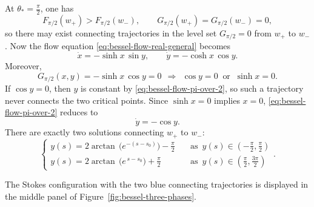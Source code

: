 \documentclass[11pt]{amsart}
\theoremstyle{plain}
\begin{document}
At \(\theta_*=\frac{\pi}{2}\), one has 
\[F_{\pi/2}(w_+)>F_{\pi/2}(w_-),\qquad G_{\pi/2}(w_+)=G_{\pi/2}(w_-)=0,\]
so there may exist connecting trajectories in the level set $G_{\pi/2}=0$ from \(w_+\) to \(w_-\). Now the flow equation \eqref{eq:bessel-flow-real-general} becomes
\begin{equation}\label{eq:bessel-flow-pi-over-2}
\dot x=-\sinh x\,\sin y,
\qquad
\dot y=-\cosh x\,\cos y.
\end{equation}
Moreover, 
\[
G_{\pi/2}(x,y)=-\sinh x\,\cos y=0~~\Longrightarrow~~ \cos y=0~\text{ or }~ \sinh x=0.
\]
If \(\cos y=0\), then \(y\) is constant by \eqref{eq:bessel-flow-pi-over-2}, so such a trajectory never connects the two critical points.  Since $\sinh x=0$ implies $x=0$, \eqref{eq:bessel-flow-pi-over-2} reduces to
\[
\dot y=-\cos y.
\]
There are exactly two solutions connecting \(w_+\) to \(w_-\):
\begin{equation*}\label{eq:bessel-traj-right}
\begin{cases}
    y(s)=2\arctan\,\bigl(e^{-(s-s_0)}\bigr)-\frac{\pi}{2}  \quad  &\text{as } \, y(s)\in\left(-\frac{\pi}{2},\frac{\pi}{2}\right) 
    \\[0.1cm]
    y(s)=2\arctan\,\bigl(e^{\,s-s_0}\bigr)+\frac{\pi}{2}
    \quad  &\text{as } \, y(s)\in\left(\frac{\pi}{2},\frac{3\pi}{2}\right) 
\end{cases}.
\end{equation*}


The Stokes configuration with the two blue connecting trajectories is displayed in the middle panel of Figure~\ref{fig:bessel-three-phases}.
\end{document}
